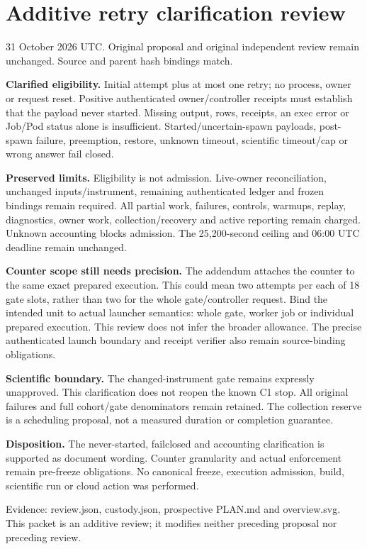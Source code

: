 \documentclass[11pt]{article}
\begin{document}
\section*{Additive retry clarification review}
31 October 2026 UTC. Original proposal and original independent review remain unchanged. Source and parent hash bindings match.

\textbf{Clarified eligibility.} Initial attempt plus at most one retry; no process, owner or request reset. Positive authenticated owner/controller receipts must establish that the payload never started. Missing output, rows, receipts, an exec error or Job/Pod status alone is insufficient. Started/uncertain-spawn payloads, post-spawn failure, preemption, restore, unknown timeout, scientific timeout/cap or wrong answer fail closed.

\textbf{Preserved limits.} Eligibility is not admission. Live-owner reconciliation, unchanged inputs/instrument, remaining authenticated ledger and frozen bindings remain required. All partial work, failures, controls, warmups, replay, diagnostics, owner work, collection/recovery and active reporting remain charged. Unknown accounting blocks admission. The 25,200-second ceiling and 06:00 UTC deadline remain unchanged.

\textbf{Counter scope still needs precision.} The addendum attaches the counter to the same exact prepared execution. This could mean two attempts per each of 18 gate slots, rather than two for the whole gate/controller request. Bind the intended unit to actual launcher semantics: whole gate, worker job or individual prepared execution. This review does not infer the broader allowance. The precise authenticated launch boundary and receipt verifier also remain source-binding obligations.

\textbf{Scientific boundary.} The changed-instrument gate remains expressly unapproved. This clarification does not reopen the known C1 stop. All original failures and full cohort/gate denominators remain retained. The collection reserve is a scheduling proposal, not a measured duration or completion guarantee.

\textbf{Disposition.} The never-started, failclosed and accounting clarification is supported as document wording. Counter granularity and actual enforcement remain pre-freeze obligations. No canonical freeze, execution admission, build, scientific run or cloud action was performed.

Evidence: review.json, custody.json, prospective PLAN.md and overview.svg. This packet is an additive review; it modifies neither preceding proposal nor preceding review.
\end{document}
